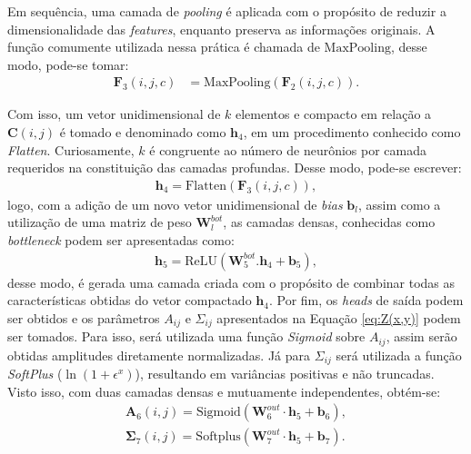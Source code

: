 \documentclass[a4paper, 12pt]{report}
\begin{document}
Em sequência, uma camada de \textit{pooling} é aplicada com o propósito de reduzir a dimensionalidade das \textit{features}, enquanto preserva as informações originais. A função comumente utilizada nessa prática é chamada de $\text{MaxPooling}$, desse modo, pode-se tomar:
\begin{align}
	\mathbf{F}_3(i, j, c) &= \text{MaxPooling}(\mathbf{F}_2(i, j, c)).
	\label{eq:F3}
\end{align} 

Com isso, um vetor unidimensional de $k$ elementos e compacto em relação a $\mathbf{C}(i,j)$ é tomado e denominado como $\mathbf{h}_4$, em um procedimento conhecido como \textit{Flatten}. Curiosamente, $k$ é congruente ao número de neurônios por camada requeridos na constituição das camadas profundas. Desse modo, pode-se escrever:
\begin{align}
	\mathbf{h}_4 = \text{Flatten}(\mathbf{F}_3(i, j, c)),
	\label{eq:h4}
\end{align}
logo, com a adição de um novo vetor unidimensional de \textit{bias} $\mathbf{b}_l$, assim como a utilização de uma matriz de peso $\mathbf{W}_{l}^{bot}$, as camadas densas, conhecidas como \textit{bottleneck} podem ser apresentadas como:
\begin{align}
	\mathbf{h}_5 = \text{ReLU}(\mathbf{W}_{5}^{bot} . \mathbf{h}_4 + \mathbf{b}_5),
	\label{eq:h5}
\end{align}
desse modo, é gerada uma camada criada com o propósito de combinar todas as características obtidas do vetor compactado $\mathbf{h}_4$. Por fim, os \textit{heads} de saída podem ser obtidos e os parâmetros $A_{ij}$ e $\Sigma_{ij}$ apresentados na Equação \ref{eq:Z(x,y)} podem ser tomados. Para isso, será utilizada uma função \textit{Sigmoid} sobre $A_{ij}$, assim serão obtidas amplitudes diretamente normalizadas. Já para $\Sigma_{ij}$ será utilizada a função \textit{SoftPlus} ($\ln(1+\epsilon^x)$), resultando em variâncias positivas e não truncadas. Visto isso, com duas camadas densas e mutuamente independentes, obtém-se:
\begin{align}
	\mathbf{A}_6(i, j) = \text{Sigmoid}(\mathbf{W}_{6}^{out} \cdot \mathbf{h}_5 + \mathbf{b}_6),\\
	\mathbf{\Sigma}_7(i, j) = \text{Softplus}(\mathbf{W}_{7}^{out} \cdot \mathbf{h}_5 + \mathbf{b}_7).
	\label{eq:AeSigma}
\end{align}
\end{document}
